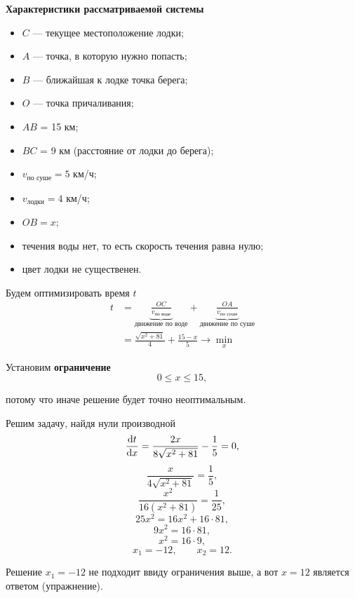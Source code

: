 \textbf{Характеристики рассматриваемой системы}
\begin{itemize}[nosep]
	\item $C$ --- текущее местоположение лодки;
	
	\item $A$ --- точка, в которую нужно попасть;
	
	\item $B$ --- ближайшая к лодке точка берега;
	
	\item $O$ --- точка причаливания;
	
	\item $AB$ = 15 км;
	
	\item $BC$ = 9 км (расстояние от лодки до берега);
	
	\item $v_{\text{по суше}} = 5$ км/ч;
	
	\item $v_{\text{лодки}} = 4$ км/ч;
		
	\item $OB = x$;
	
	\item течения воды нет, то есть скорость течения равна нулю;
	
	\item цвет лодки не существенен.
\end{itemize}

\bigskip

Будем оптимизировать время $t$
\begin{align*}
	t &= \underbrace{\frac{OC}{v_{\text{по воде}}}}_{\text{движение по воде}} + \underbrace{\frac{OA}{v_{\text{по суше}}}}_{\text{движение по суше}} \\
	&= \boxed{\frac{\sqrt{x^2+81}}{4} + \frac{15 - x}{5} \to \min_x}
\end{align*}

Установим \textbf{ограничение}
\[
	0 \le x \le 15,
\]

потому что иначе решение будет точно неоптимальным.

\bigskip

Решим задачу, найдя нули производной
\[\derivative{t}{x} = \frac{2x}{8\sqrt{x^2+81}} - \frac{1}{5} = 0,\]
\[\frac{x}{4\sqrt{x^2+81}} = \frac{1}{5},\]
\[\frac{x^2}{16(x^2 + 81)} = \frac{1}{25},\]
\[	25x^2 = 16x^2 + 16 \cdot 81,\]
\[9x^2 = 16 \cdot 81,\]
\[x^2 = 16 \cdot 9,\]
\[x_1 = -12, \qquad x_2 = 12.\]

Решение $x_1 = -12$ не подходит ввиду ограничения выше, а вот $\boxed{x = 12}$ является ответом (упражнение).

